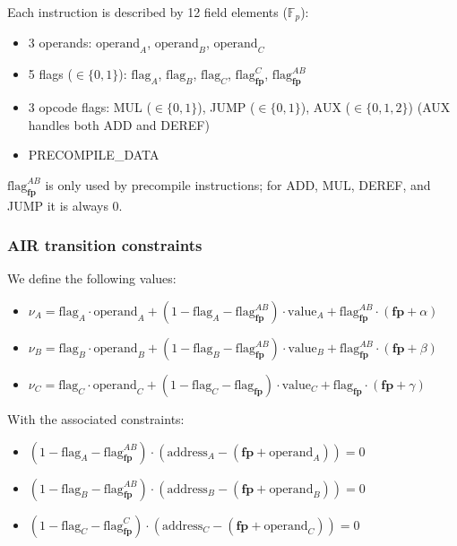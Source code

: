 \documentclass{article}
\theoremstyle{definition}
\newcommand{\Fp}{\mathbb F_p}
\begin{document}
Each instruction is described by 12 field elements ($\Fp$):

\begin{itemize}
    \item 3 operands: $\text{operand}_A$, $\text{operand}_B$, $\text{operand}_C$
    \item 5 flags ($\in \{0, 1\}$): $\text{flag}_A$, $\text{flag}_B$, $\text{flag}_C$, $\text{flag}^{C}_\textbf{fp}$, $\text{flag}^{AB}_\textbf{fp}$
    \item 3 opcode flags: MUL ($\in \{0, 1\}$), JUMP ($\in \{0, 1\}$), AUX ($\in \{0, 1, 2\}$) (AUX handles both ADD and DEREF)
    \item PRECOMPILE\_DATA
\end{itemize}

$\text{flag}^{AB}_\textbf{fp}$ is only used by precompile instructions; for ADD, MUL, DEREF, and JUMP it is always 0.


\subsubsection{AIR transition constraints}


\vspace{5mm}

We define the following values:
\begin{itemize}
    \item $\nu_A = \text{flag}_A \cdot \text{operand}_A + (1 - \text{flag}_A - \text{flag}^{AB}_\textbf{fp}) \cdot \text{value}_A + \text{flag}^{AB}_\textbf{fp} \cdot (\textbf{fp} + \alpha)$ 
    \item $\nu_B = \text{flag}_B \cdot \text{operand}_B + (1 - \text{flag}_B - \text{flag}^{AB}_\textbf{fp}) \cdot \text{value}_B + \text{flag}^{AB}_\textbf{fp} \cdot (\textbf{fp} + \beta)$
    \item $\nu_C = \text{flag}_C \cdot \text{operand}_C + (1 - \text{flag}_C - \text{flag}_\textbf{fp}) \cdot \text{value}_C + \text{flag}_\textbf{fp} \cdot (\textbf{fp} + \gamma)$
\end{itemize}


With the associated constraints:
\begin{itemize}
    \item $(1 - \text{flag}_A - \text{flag}^{AB}_\textbf{fp}) \cdot (\text{address}_A - (\textbf{fp} + \text{operand}_A)) = 0$
    \item $(1 - \text{flag}_B - \text{flag}^{AB}_\textbf{fp}) \cdot (\text{address}_B - (\textbf{fp} + \text{operand}_B)) = 0$
    \item $(1 - \text{flag}_C - \text{flag}^{C}_\textbf{fp}) \cdot (\text{address}_C - (\textbf{fp} + \text{operand}_C)) = 0$
\end{itemize}
\end{document}
